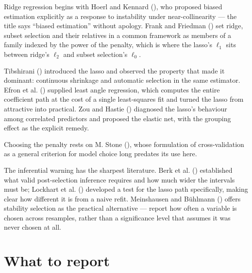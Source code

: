 \documentclass[
  letterpaper,
  10pt,
  twoside,
  openright,
  numbers=noenddot,
  chapterprefix=true]{scrbook}
\begin{document}
\begin{qmiblit}

Ridge regression begins with Hoerl and Kennard
(), who proposed biased estimation
explicitly as a response to instability under near-collinearity --- the
title says ``biased estimation'' without apology. Frank and Friedman
() set ridge, subset selection and their
relatives in a common framework as members of a family indexed by the
power of the penalty, which is where the lasso's \(\ell_1\) sits between
ridge's \(\ell_2\) and subset selection's \(\ell_0\).

Tibshirani () introduced the lasso
and observed the property that made it dominant: continuous shrinkage
and automatic selection in the same estimator. Efron et al.
() supplied least angle regression, which
computes the entire coefficient path at the cost of a single
least-squares fit and turned the lasso from attractive into practical.
Zou and Hastie () diagnosed the lasso's
behaviour among correlated predictors and proposed the elastic net, with
the grouping effect as the explicit remedy.

Choosing the penalty rests on M. Stone (),
whose formulation of cross-validation as a general criterion for model
choice long predates its use here.

The inferential warning has the sharpest literature. Berk et al.
() established what valid post-selection
inference requires and how much wider the intervals must be; Lockhart et
al. () developed a test for the lasso
path specifically, making clear how different it is from a naive refit.
Meinshausen and Bühlmann () offers
stability selection as the practical alternative --- report how often a
variable is chosen across resamples, rather than a significance level
that assumes it was never chosen at all.

\end{qmiblit}

\section{What to report}\label{what-to-report-3}
\end{document}
